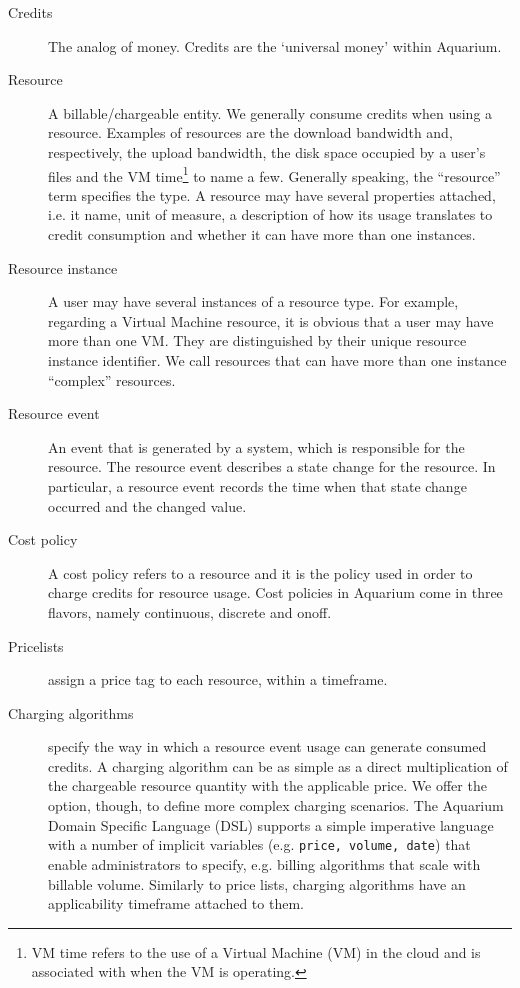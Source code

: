\documentclass[preprint,10pt]{sigplanconf}
\begin{document}
\begin{description}
\item[Credits]
The analog of money. Credits are the `universal money' within Aquarium.

\item[Resource]
A billable/chargeable entity. We generally consume credits when using a resource. Examples of resources are the \textsf{download bandwidth} and, respectively,  the \textsf{upload bandwidth}, the \textsf{disk space} occupied by a user's files and the \textsf{VM time}\footnote{\textsf{VM time} refers to the use of a Virtual Machine (VM) in the cloud and is associated with when the VM is operating.} to name a few. Generally speaking, the ``resource'' term specifies the type. A resource may have several properties attached, i.e. it name, unit of measure, a description of how its usage translates to credit consumption and whether it can have more than one instances.

\item[Resource instance]
A user may have several instances of a resource type. For example, regarding a \textsf{Virtual Machine} resource, it is obvious that a user may have more than one VM. They are distinguished by their unique resource instance identifier. We call resources that can have more than one instance ``complex'' resources.

\item[Resource event]
An event that is generated by a system, which is responsible for the resource.
The resource event describes a state change for the resource. In particular, a resource event records the time when that state change occurred and the changed value.

\item[Cost policy]
A cost policy refers to a resource and it is the policy used in order to charge credits for resource usage. Cost policies in Aquarium come in three flavors, namely \textsf{continuous}, \textsf{discrete} and \textsf{onoff}.
          
\item[Pricelists] assign a price tag to each resource, within a timeframe.

\item[Charging algorithms] specify the way in which a resource event usage can generate consumed credits. 
A charging algorithm can be as simple as a direct multiplication of the 
        chargeable resource quantity with the applicable price. We offer the option, though, to define more complex charging  scenarios. The Aquarium Domain Specific Language (DSL) supports a simple imperative language with
        a number of implicit variables (e.g. \texttt{price, volume, date}) 
        that enable administrators to specify, e.g. billing algorithms that
        scale with billable volume. Similarly to price lists, charging algorithms
        have an applicability timeframe attached to them.
        

\end{description}
\end{document}
